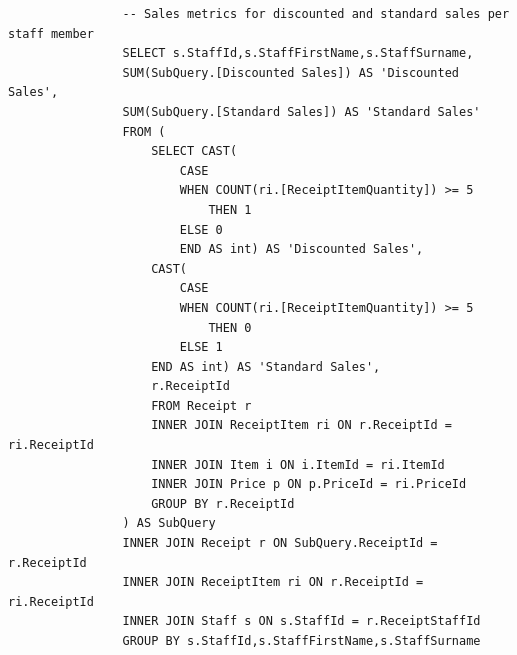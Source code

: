 \documentclass{article}
\begin{document}
            \begin{lstlisting}
                -- Sales metrics for discounted and standard sales per staff member
                SELECT s.StaffId,s.StaffFirstName,s.StaffSurname,
                SUM(SubQuery.[Discounted Sales]) AS 'Discounted Sales',
                SUM(SubQuery.[Standard Sales]) AS 'Standard Sales'
                FROM (
                    SELECT CAST(
                        CASE
                        WHEN COUNT(ri.[ReceiptItemQuantity]) >= 5
                            THEN 1
                        ELSE 0
                        END AS int) AS 'Discounted Sales',
                    CAST(
                        CASE
                        WHEN COUNT(ri.[ReceiptItemQuantity]) >= 5
                            THEN 0
                        ELSE 1
                    END AS int) AS 'Standard Sales',
                    r.ReceiptId
                    FROM Receipt r
                    INNER JOIN ReceiptItem ri ON r.ReceiptId = ri.ReceiptId
                    INNER JOIN Item i ON i.ItemId = ri.ItemId
                    INNER JOIN Price p ON p.PriceId = ri.PriceId
                    GROUP BY r.ReceiptId
                ) AS SubQuery
                INNER JOIN Receipt r ON SubQuery.ReceiptId = r.ReceiptId
                INNER JOIN ReceiptItem ri ON r.ReceiptId = ri.ReceiptId
                INNER JOIN Staff s ON s.StaffId = r.ReceiptStaffId
                GROUP BY s.StaffId,s.StaffFirstName,s.StaffSurname
            \end{lstlisting}
\end{document}
